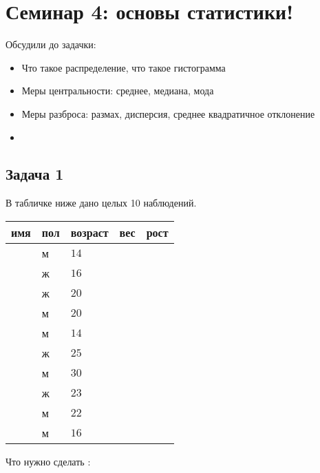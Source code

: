 \documentclass[12pt, a4paper, oneside]{article}
\begin{document}
\section*{Семинар 4: основы статистики! }

Обсудили до задачки: 

\begin{itemize}
	\item  Что такое распределение, что такое гистограмма 
	
	\item Меры центральности: среднее, медиана, мода 
	
	\item Меры разброса: размах, дисперсия, среднее квадратичное отклонение
	
	\item 
	
\end{itemize}


\subsection*{Задача 1}

В табличке ниже дано целых 10 наблюдений.  

\begin{center}
\begin{tabular}{@{}lllll@{}}
	\toprule
	имя & пол  & возраст  & вес & рост  \\ \midrule
	& м  & $14$ &  &  \\
	& ж & $16$ &  &  \\
	& ж & $20$ &  &  \\
	& м & $20$ &  &  \\
	& м & $14$ &  &  \\
	& ж & $25$ &  &  \\
	& м & $30$ &  &  \\
	& ж & $23$ &  &  \\
	& м & $22$ &  &  \\
	& м & $16$  &  &  \\ \bottomrule
\end{tabular}	
\end{center}


Что нужно сделать : 
\end{document}
